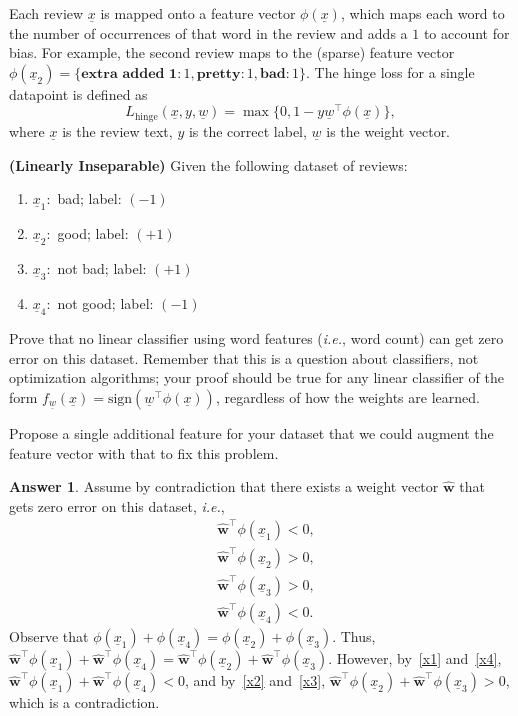 \documentclass{article}
\theoremstyle{definition}
\newtheorem*{answer}{Answer}
\begin{document}
\begin{question}
	Each review $\underline{x}$ is mapped onto a feature vector $\phi(\underline{x})$, which maps each word to the number of occurrences of that word in the review and adds a $1$ to account for bias. For example, the second review maps to the (sparse) feature vector $\phi(\underline{x}_2)=\{\textbf{extra added 1}:1, \textbf{pretty}:1,\textbf{bad}:1\}$. The hinge loss for a single datapoint is defined as
	\begin{equation*}
		L_{\text{hinge}}(\underline{x}, y,\underline{w})= \max\{0, 1-y\underline{w}^\top\phi(\underline{x})\},
	\end{equation*}
	where $\underline{x}$ is the review text, $y$ is the correct label, $\underline{w}$ is the weight vector.
	\begin{question}
		\item \textbf{(Linearly Inseparable)} Given the following dataset of reviews:
		\begin{enumerate}
			\item $\underline{x}_1:$ bad; label: $(-1)$
			\item $\underline{x}_2:$ good; label: $(+1)$
			\item $\underline{x}_3:$ not bad; label: $(+1)$
			\item $\underline{x}_4:$ not good; label: $(-1)$
		\end{enumerate}
		
		Prove that no linear classifier using word features (\textit{i.e.}, word count) can get zero error on this dataset. Remember that this is a question about classifiers, not optimization algorithms; your proof should be true for any linear classifier of the form $f_{\underline{w}}(\underline{x})=\text{sign}(\underline{w}^\top\phi(\underline{x}))$, regardless of how the weights are learned.
		
		Propose a single additional feature for your dataset that we could augment the feature vector with that to fix this problem.
		\begin{answer}
			Assume by contradiction that there exists a weight vector $\mathbf{\hat{w}}$ that gets zero error on this dataset, \textit{i.e.},
			\begin{align}
					&\mathbf{\hat{w}}^\top\phi(\underline{x}_1) < 0,\label{x1}\\
					&\mathbf{\hat{w}}^\top\phi(\underline{x}_2) > 0,\label{x2}\\
					&\mathbf{\hat{w}}^\top\phi(\underline{x}_3) > 0,\label{x3}\\
					&\mathbf{\hat{w}}^\top\phi(\underline{x}_4) < 0.\label{x4}
				\end{align}
			 Observe that $\phi(\underline{x}_1) + \phi(\underline{x}_4) = \phi(\underline{x}_2)+\phi(\underline{x}_3)$. Thus, $\mathbf{\hat{w}}^\top\phi(\underline{x}_1) + \mathbf{\hat{w}}^\top\phi(\underline{x}_4) = \mathbf{\hat{w}}^\top\phi(\underline{x}_2)+ \mathbf{\hat{w}}^\top\phi(\underline{x}_3)$. However, by~\eqref{x1} and~\eqref{x4}, $\mathbf{\hat{w}}^\top\phi(\underline{x}_1) + \mathbf{\hat{w}}^\top\phi(\underline{x}_4) < 0$, and by~\eqref{x2} and~\eqref{x3}, $\mathbf{\hat{w}}^\top\phi(\underline{x}_2) + \mathbf{\hat{w}}^\top\phi(\underline{x}_3) > 0$, which is a contradiction.
			

\end{answer}
\end{question}
\end{question}
\end{document}
